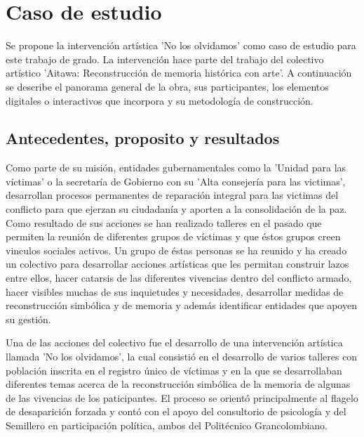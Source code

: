 
\chapter{Caso de estudio}
\label{Caso_de_estudio}

Se propone la intervención artística 'No los olvidamos' como caso de estudio para este trabajo de grado. La intervención hace parte del trabajo del colectivo artístico 'Aitawa: Reconstrucción de memoria histórica con arte'. A continuación se describe el panorama general de la obra, sus participantes, los elementos digitales o interactivos que incorpora y su metodología de construcción.

\section{Antecedentes, proposito y resultados}

Como parte de su misión, entidades gubernamentales como la 'Unidad para las víctimas' o la secretaría de Gobierno con su 'Alta consejería para las victimas', desarrollan procesos permanentes de reparación integral para las victimas del conflicto para que ejerzan su ciudadanía y aporten a la consolidación de la paz. Como resultado de sus acciones se han realizado talleres en el pasado que permiten la reunión de diferentes grupos de víctimas y que éstos grupos creen vinculos sociales activos. Un grupo de éstas personas se ha reunido y ha creado un colectivo para desarrollar acciones artísticas que les permitan construir lazos entre ellos, hacer catarsis de las diferentes vivencias dentro del conflicto armado, hacer visibles muchas de sus inquietudes y necesidades, desarrollar medidas de reconstrucción simbólica y de memoria y además identificar entidades que apoyen su gestión.

Una de las acciones del colectivo fue el desarrollo de una intervención artística llamada 'No los olvidamos', la cual consistió en el desarrollo de varios talleres con población inscrita en el registro único de víctimas y en la que se desarrollaban diferentes temas acerca de la reconstrucción simbólica de la memoria de algunas de las vivencias de los paticipantes. El proceso se orientó principalmente al flagelo de desaparición forzada y contó con el apoyo del consultorio de psicología y del Semillero en participación política, ambos del Politécnico Grancolombiano.


